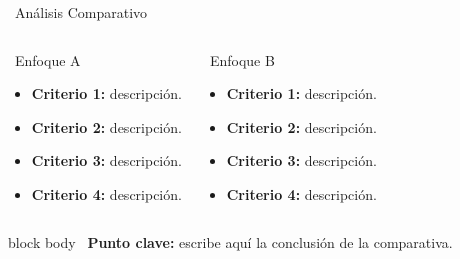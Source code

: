 \documentclass[10pt, aspectratio=169]{beamer}
\begin{document}
\begin{frame}{\faBalanceScale \ Análisis Comparativo}
  \begin{columns}[T, onlytextwidth]
    \begin{block}{\faArrowLeft \ Enfoque A}
      \begin{itemize}
        \item \textbf{Criterio 1:} descripción.
        \item \textbf{Criterio 2:} descripción.
        \item \textbf{Criterio 3:} descripción.
        \item \textbf{Criterio 4:} descripción.
      \end{itemize}
    \end{block}

    \begin{block}{\faArrowRight \ Enfoque B}
      \begin{itemize}
        \item \textbf{Criterio 1:} descripción.
        \item \textbf{Criterio 2:} descripción.
        \item \textbf{Criterio 3:} descripción.
        \item \textbf{Criterio 4:} descripción.
      \end{itemize}
    \end{block}
  \end{columns}

  \vspace{0.35cm}
  \begin{center}
    \begin{beamercolorbox}[rounded=true, wd=0.8\textwidth, sep=0.12cm, center]{block body}
      \footnotesize \textcolor{unabblue}{\faLightbulb \ \textbf{Punto clave:}} escribe aquí la conclusión de la comparativa.
    \end{beamercolorbox}
  \end{center}
\end{frame}
\end{document}
